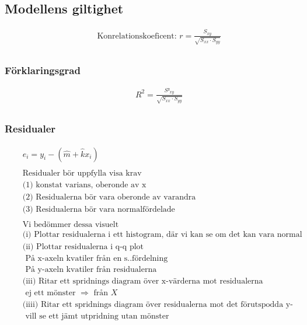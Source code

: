 \subsection{Modellens giltighet}
\begin{align*}
  &\quad  \text{Konrelationskoeficent: } r=\frac{S_{xy}}{\sqrt{S_{xx}\cdot S_{yy}}} \\
\end{align*}

\subsubsection{Förklaringsgrad}
\begin{align*}
  &\quad  R^2=\frac{S²_{xy}}{\sqrt{S_{xx}\cdot S_{yy}}} \\
\end{align*}

\subsubsection{Residualer}
\begin{align*}
  &\quad  e_i=y_i-(\hat{m}+\hat{k}x_i) \\
  &\quad  \\
  &\quad  \text{Residualer bör uppfylla visa krav}\\
  &\quad  \text{(1) konstat varians, oberonde av x} \\
  &\quad  \text{(2) Residualerna bör vara oberonde av varandra} \\
  &\quad  \text{(3) Residualerna bör vara normalfördelade} \\
  &\quad  \\
  &\quad  \text{Vi bedömmer dessa visuelt} \\
  &\quad  \text{(i) Plottar residualerna i ett histogram, där vi kan se om det kan vara normal fördelat} \\
  &\quad  \text{(ii) Plottar residualerna i q-q plot} \\
  &\quad  \text{  På x-axeln kvatiler från en s..fördelning} \\
  &\quad  \text{  På y-axeln kvatiler från residualerna} \\
  &\quad  \text{(iii) Ritar ett spridnings diagram över x-värderna mot residualerna} \\
  &\quad  \text{  ej ett mönster $\Rightarrow$ från $X$} \\
  &\quad  \text{(iiii) Ritar ett spridnings diagram över residualerna mot det förutspodda y-värdet} \\
  &\quad  \text{ vill se ett jämt utpridning utan mönster} \\
\end{align*}

